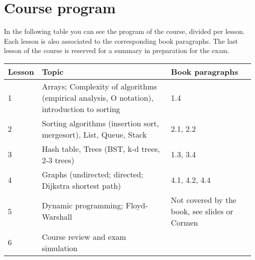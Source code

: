 \section{Course program}
	
	In the following table you can see the program of the course, divided per lesson. Each lesson is also associated to the corresponding book paragraphs. The last lesson of the course is reserved for a summary in preparation for the exam. \\
	
	\begin{tabular}{ | p{1.2cm} | p{10cm} | p{3.7cm} | }
		\hline
	  	\textbf{Lesson} & \textbf{Topic} & \textbf{Book paragraphs} \\
	  	\hline
  		1 & Arrays; Complexity of algorithms (empirical analysis, O notation), introduction to sorting & 1.4 \\
  		\hline
  		2 & Sorting algorithms  (insertion sort, mergesort), List, Queue, Stack & 2.1, 2.2 \\
  		\hline
  		3 & Hash table, Trees (BST, k-d trees, 2-3 trees) & 1.3, 3.4 \\
  		\hline
  		4 & Graphs (undirected; directed; Dijkstra shortest path) & 4.1, 4.2, 4.4 \\
  		\hline
  		5 & Dynamic programming; Floyd-Warshall & Not covered by the book, see slides or Cormen\\
  		\hline
  		6 & Course review and exam simulation & \\
  		\hline
	\end{tabular}
\begin{comment}
  		4 & Binary search trees & 3.2 \\
  		\hline
  		5 & Balanced search trees: 2-3 search trees & 3.3 \\
  		\hline
  		6 & Graphs (undirected; directed; Dijkstra shortest path) & 4.1, 4.2, 4.4 \\
  		\hline
  		7 & Dynamic programming; Floyd-Warshall & Not covered by the book, see slides or Cormen\\
  		\hline
  		8 & Course recap & \\
  		\hline
\end{comment}
